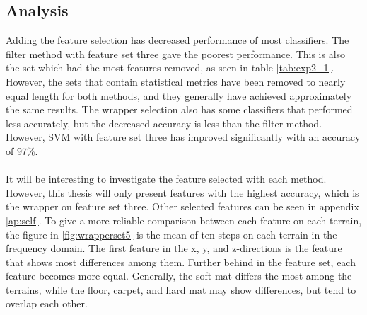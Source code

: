 \documentclass[USenglish]{ifimaster}  %
\begin{document}
\subsection{Analysis}
Adding the feature selection has decreased performance of most classifiers. The filter method with feature set three gave the poorest performance. This is also the set which had the most features removed, as seen in table \ref{tab:exp2_1}. However, the sets that contain statistical metrics have been removed to nearly equal length for both methods, and they generally have achieved approximately the same results. The wrapper selection also has some classifiers that performed less accurately, but the decreased accuracy is less than the filter method. However, SVM with feature set three has improved significantly with an accuracy of 97\%.
\\
\\
It will be interesting to investigate the feature selected with each method. However, this thesis will only present features with the highest accuracy, which is the wrapper on feature set three. Other selected features can be seen in appendix \ref{ap:self}. To give a more reliable comparison between each feature on each terrain, the figure in \ref{fig:wrapperset5} is the mean of ten steps on each terrain in the frequency domain. The first feature in the x, y, and z-directions is the feature that shows most differences among them. Further behind in the feature set, each feature becomes more equal. Generally, the soft mat differs the most among the terrains, while the floor, carpet, and hard mat may show differences, but tend to overlap each other.
\end{document}
